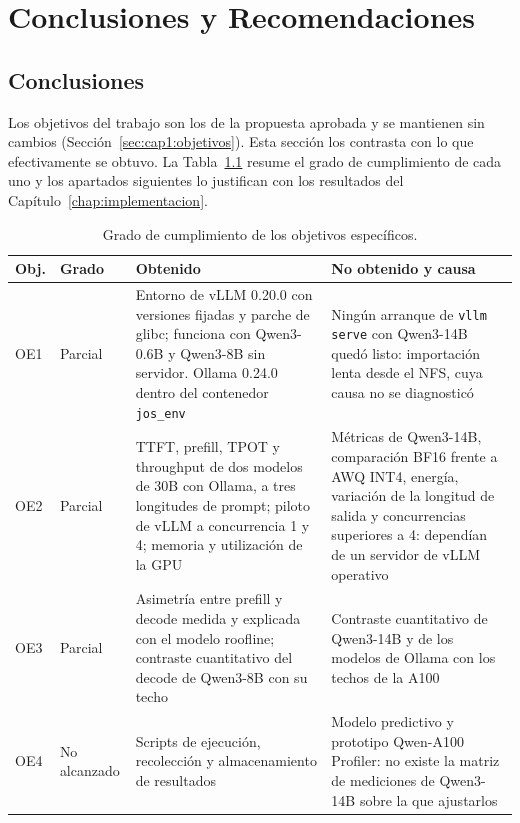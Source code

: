 \chapter{Conclusiones y Recomendaciones}
\label{chap:conclusiones}

\section{Conclusiones}
\label{sec:cap4:conclusiones}

Los objetivos del trabajo son los de la propuesta aprobada y se mantienen sin cambios (Sección~\ref{sec:cap1:objetivos}). Esta sección los contrasta con lo que efectivamente se obtuvo. La Tabla~\ref{tab:cap4:objetivos} resume el grado de cumplimiento de cada uno y los apartados siguientes lo justifican con los resultados del Capítulo~\ref{chap:implementacion}.

\begin{table}[htbp]
  \centering
  \caption{Grado de cumplimiento de los objetivos específicos.}
  \label{tab:cap4:objetivos}
  \footnotesize
  \begin{tabular}{|p{}|p{}|p{}|p{}|}
    \hline
    \textbf{Obj.} & \textbf{Grado} & \textbf{Obtenido} & \textbf{No obtenido y causa} \\
    \hline
    OE1 & Parcial & Entorno de vLLM 0.20.0 con versiones fijadas y parche de glibc; funciona con Qwen3-0.6B y Qwen3-8B sin servidor. Ollama 0.24.0 dentro del contenedor \texttt{jos\_env} & Ningún arranque de \texttt{vllm serve} con Qwen3-14B quedó listo: importación lenta desde el NFS, cuya causa no se diagnosticó \\
    \hline
    OE2 & Parcial & TTFT, prefill, TPOT y throughput de dos modelos de 30B con Ollama, a tres longitudes de prompt; piloto de vLLM a concurrencia 1 y 4; memoria y utilización de la GPU & Métricas de Qwen3-14B, comparación BF16 frente a AWQ INT4, energía, variación de la longitud de salida y concurrencias superiores a 4: dependían de un servidor de vLLM operativo \\
    \hline
    OE3 & Parcial & Asimetría entre prefill y decode medida y explicada con el modelo roofline; contraste cuantitativo del decode de Qwen3-8B con su techo & Contraste cuantitativo de Qwen3-14B y de los modelos de Ollama con los techos de la A100 \\
    \hline
    OE4 & No alcanzado & Scripts de ejecución, recolección y almacenamiento de resultados & Modelo predictivo y prototipo Qwen-A100 Profiler: no existe la matriz de mediciones de Qwen3-14B sobre la que ajustarlos \\
    \hline
  \end{tabular}
\end{table}

